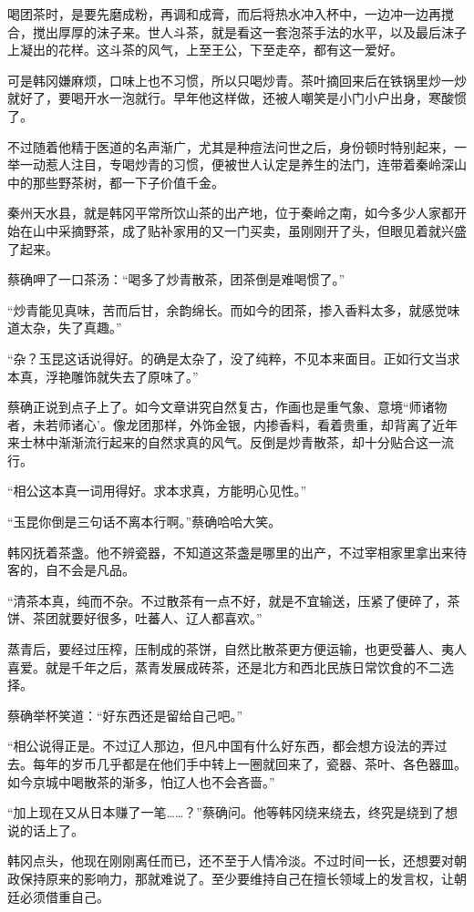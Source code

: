 喝团茶时，是要先磨成粉，再调和成膏，而后将热水冲入杯中，一边冲一边再搅合，搅出厚厚的沫子来。世人斗茶，就是看这一套泡茶手法的水平，以及最后沫子上凝出的花样。这斗茶的风气，上至王公，下至走卒，都有这一爱好。

可是韩冈嫌麻烦，口味上也不习惯，所以只喝炒青。茶叶摘回来后在铁锅里炒一炒就好了，要喝开水一泡就行。早年他这样做，还被人嘲笑是小门小户出身，寒酸惯了。

不过随着他精于医道的名声渐广，尤其是种痘法问世之后，身份顿时特别起来，一举一动惹人注目，专喝炒青的习惯，便被世人认定是养生的法门，连带着秦岭深山中的那些野茶树，都一下子价值千金。

秦州天水县，就是韩冈平常所饮山茶的出产地，位于秦岭之南，如今多少人家都开始在山中采摘野茶，成了贴补家用的又一门买卖，虽刚刚开了头，但眼见着就兴盛了起来。

蔡确呷了一口茶汤：“喝多了炒青散茶，团茶倒是难喝惯了。”

“炒青能见真味，苦而后甘，余韵绵长。而如今的团茶，掺入香料太多，就感觉味道太杂，失了真趣。”

“杂？玉昆这话说得好。的确是太杂了，没了纯粹，不见本来面目。正如行文当求本真，浮艳雕饰就失去了原味了。”

蔡确正说到点子上了。如今文章讲究自然复古，作画也是重气象、意境“师诸物者，未若师诸心’。像龙团那样，外饰金银，内掺香料，看着贵重，却背离了近年来士林中渐渐流行起来的自然求真的风气。反倒是炒青散茶，却十分贴合这一流行。

“相公这本真一词用得好。求本求真，方能明心见性。”

“玉昆你倒是三句话不离本行啊。”蔡确哈哈大笑。

韩冈抚着茶盏。他不辨瓷器，不知道这茶盏是哪里的出产，不过宰相家里拿出来待客的，自不会是凡品。

“清茶本真，纯而不杂。不过散茶有一点不好，就是不宜输送，压紧了便碎了，茶饼、茶团就要好很多，吐蕃人、辽人都喜欢。”

蒸青后，要经过压榨，压制成的茶饼，自然比散茶更方便运输，也更受蕃人、夷人喜爱。就是千年之后，蒸青发展成砖茶，还是北方和西北民族日常饮食的不二选择。

蔡确举杯笑道：“好东西还是留给自己吧。”

“相公说得正是。不过辽人那边，但凡中国有什么好东西，都会想方设法的弄过去。每年的岁币几乎都是在他们手中转上一圈就回来了，瓷器、茶叶、各色器皿。如今京城中喝散茶的渐多，怕辽人也不会吝啬。”

“加上现在又从日本赚了一笔……？”蔡确问。他等韩冈绕来绕去，终究是绕到了想说的话上了。

韩冈点头，他现在刚刚离任而已，还不至于人情冷淡。不过时间一长，还想要对朝政保持原来的影响力，那就难说了。至少要维持自己在擅长领域上的发言权，让朝廷必须借重自己。

